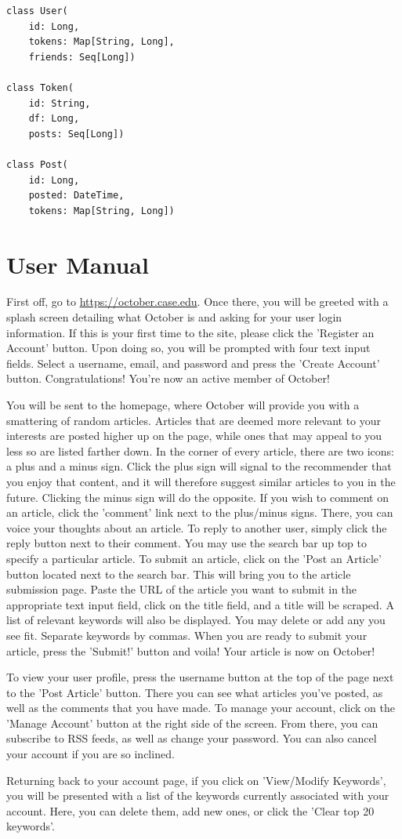 \documentclass[11pt,letterpaper,titlepage]{article}
\begin{document}
\begin{verbatim}
class User(
    id: Long,
    tokens: Map[String, Long],
    friends: Seq[Long])

class Token(
    id: String,
    df: Long,
    posts: Seq[Long])

class Post(
    id: Long,
    posted: DateTime,
    tokens: Map[String, Long])
\end{verbatim}

\section{User Manual}

First off, go to \url{https://october.case.edu}.
Once there, you will be greeted with a splash screen detailing what October is and asking for your user login information. If this is your first time to the site, please click the 'Register an Account' button.
Upon doing so, you will be prompted with four text input fields. Select a username, email, and password and press the 'Create Account' button.
Congratulations! You're now an active member of October!

You will be sent to the homepage, where October will provide you with a smattering of random articles.
Articles that are deemed more relevant to your interests are posted higher up on the page, while ones that may appeal to you less so are listed farther down.
In the corner of every article, there are two icons: a plus and a minus sign.
Click the plus sign will signal to the recommender that you enjoy that content, and it will therefore suggest similar articles to you in the future. Clicking the minus sign will do the opposite.
If you wish to comment on an article, click the 'comment' link next to the plus/minus signs.
There, you can voice your thoughts about an article.
To reply to another user, simply click the reply button next to their comment.
You may use the search bar up top to specify a particular article.
To submit an article, click on the 'Post an Article' button located next to the search bar.
This will bring you to the article submission page.
Paste the URL of the article you want to submit in the appropriate text input field, click on the title field, and a title will be scraped.
A list of relevant keywords will also be displayed.
You may delete or add any you see fit.
Separate keywords by commas.
When you are ready to submit your article, press the 'Submit!' button and voila!
Your article is now on October!

To view your user profile, press the username button at the top of the page next to the 'Post Article' button.
There you can see what articles you've posted, as well as the comments that you have made.
To manage your account, click on the 'Manage Account' button at the right side of the screen.
From there, you can  subscribe to RSS feeds, as well as change your password.
You can also cancel your account if you are so inclined.

Returning back to your account page, if you click on 'View/Modify Keywords', you will be presented with a list of the keywords currently associated with your account. Here, you can delete them, add new ones, or click the 'Clear top 20 keywords'.

\end{document}
